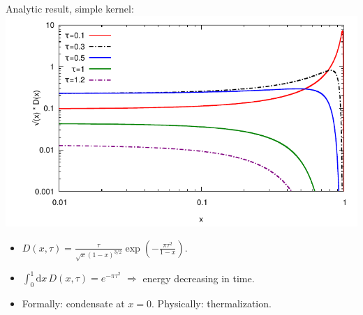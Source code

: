 \documentclass[pstricks,mathserif]{beamer}
\begin{document}
\begin{frame}[t]
Analytic result, simple kernel:
\includegraphics[width=0.9\linewidth]{plotD.pdf}

\begin{itemize}
\item $D(x,\tau)=\frac{\tau}{\sqrt{x}(1-x)^{3/2}}\exp\left(-\frac{\pi \tau^2}{1-x}\right)$. 
\item $\int_0^1 \mathrm{d}x\, D(x,\tau) = e^{-\pi\tau^2}$ $\Rightarrow$ energy decreasing in time. 
\item Formally: condensate at $x=0$. Physically: thermalization.
\end{itemize}
\end{frame}
\end{document}
